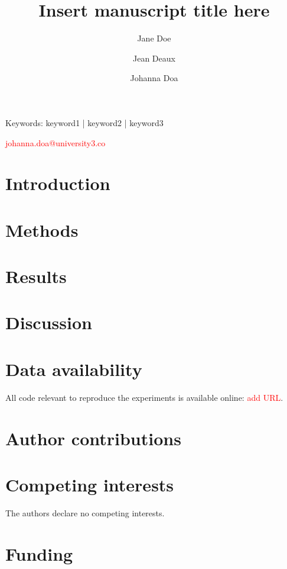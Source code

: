 
\title{Insert manuscript title here}

\author[1*]{Jane Doe}
\author[2*]{Jean Deaux}
\author[3 \Letter]{Johanna Doa}
\date{}

\twocolumn[
\begin{@tmptwocolumnfalse}
\maketitle
\end{@tmptwocolumnfalse}

\begin{abstract}

\end{abstract}
]

\begin{keywords}
Keywords: keyword1 | keyword2 | keyword3
\end{keywords}

\begin{corrauthor}
\textcolor{red}{johanna.doa@university3.co}

\end{corrauthor}

\section*{Introduction}


\section*{Methods}


\section*{Results}


\section*{Discussion}


\section*{Data availability} \label{s:code_availability}
All code relevant to reproduce the experiments is available online: \textcolor{red}{add URL}.
\clearpage
\begin{refcontext}
    \printbibliography
\end{refcontext}

\section*{Author contributions}

\section*{Competing interests}
The authors declare no competing interests.

\section*{Funding}
\lipsum[25]

